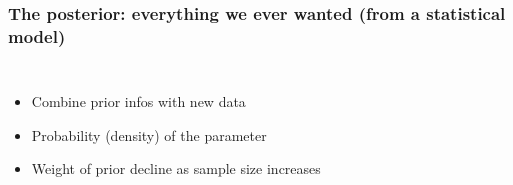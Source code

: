 \documentclass{beamer}
\begin{document}
  \begin{frame}
  \frametitle{\bf The posterior: everything we ever wanted (from a statistical model)}
  
  \begin{columns}
    \begin{itemize}
     \item Combine prior infos with new data
     \item Probability (density) of the parameter 
     \item Weight of prior decline as sample size increases
    \end{itemize}
    

\end{columns}
\end{frame}
\end{document}
